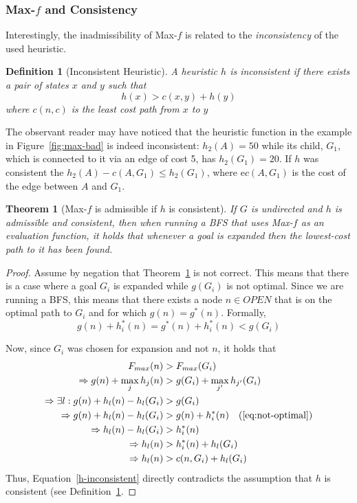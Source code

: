 \documentclass{aicom2e}
\newtheorem{definition}{Definition}
\newtheorem{theorem}{Theorem}
\begin{document}
 \subsubsection{Max-$f$ and Consistency}
 Interestingly, the inadmissibility of Max-$f$ is related to the {\em inconsistency} of the used heuristic. 
  \begin{definition}[Inconsistent Heuristic]
 A heuristic $h$ is inconsistent if there exists a pair of states $x$ and $y$ such that
 \[ h(x)>c(x,y)+h(y) \]
 where $c(n,c)$ is the least cost path from $x$ to $y$
 \label{def:inconsistent}
 \end{definition}
 The observant reader may have noticed that the heuristic function in the example in Figure~\ref{fig:max-bad} is indeed inconsistent: $h_2(A)=50$ while its child, $G_1$, which is connected to it via an edge of cost 5, has $h_2(G_1)=20$. If $h$ was consistent the $h_2(A)-c(A,G_1)\leq h_2(G_1)$, where e$c(A,G_1)$ is the cost of the edge between $A$ and $G_1$. 
 
 
\begin{theorem}[Max-$f$ is admissible if $h$ is consistent]
If $G$ is undirected and $h$ is admissible and consistent, 
then when running a BFS that uses Max-$f$ as an evaluation function,
it holds that whenever a goal is expanded then the lowest-cost path to it has been found. 
\label{the:max-f}
\end{theorem}
 \begin{proof}
 Assume by negation that Theorem~\ref{the:max-f} is not correct. This means
 that there is a case where a goal $G_i$ is expanded while $g(G_i)$ is not optimal. Since we are running a BFS, this means that there exists a node $n\in OPEN$ that is on the optimal path to $G_i$ and for which $g(n)=g^*(n)$. Formally, 
 \begin{equation}
     g(n)+h_i^*(n) = g^*(n)+h_i^*(n) < g(G_i)
    \label{eq:not-optimal}
 \end{equation}
 
 Now, since $G_i$ was chosen for expansion and not $n$, it holds that 
\begin{align}
F_{max}(n)  & > F_{max}(G_i) \\
\Rightarrow    g(n)+\max_j h_j(n)              & >  g(G_i) + \max_{j'} h_{j'}(G_i)\\
\Rightarrow \exists l:   g(n)+h_l(n)-h_l(G_i)  & > g(G_i)\\
\Rightarrow g(n)+h_l(n)-h_l(G_i)  & > g(n)+h^*_i(n) ~~~ (\ref{eq:not-optimal})\\
\Rightarrow h_l(n)-h_l(G_i)  & > h^*_i(n)\\
\Rightarrow h_l(n)   & > h^*_i(n)+h_l(G_i)\\  
\Rightarrow h_l(n)   & > c(n,G_i) +h_l(G_i) \label{eq:h-inconsistent}      
\end{align}
Thus, Equation~\ref{h-inconsistent} directly contradicts the assumption
that $h$ is consistent (see Definition~\ref{def:inconsistent}. 
\end{proof} 
\end{document}
